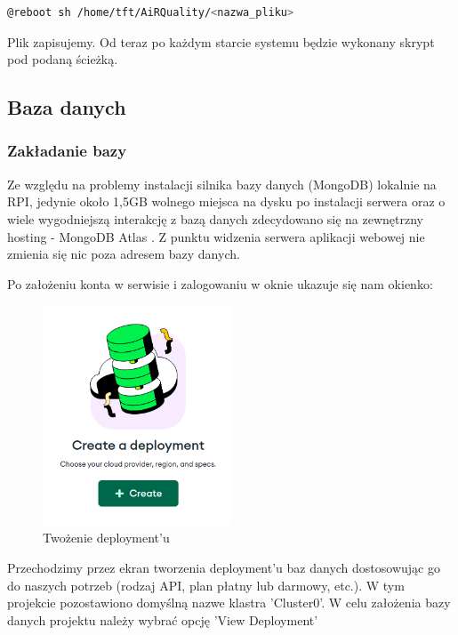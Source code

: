 \begin{lstlisting}[language=bash]
    @reboot sh /home/tft/AiRQuality/<nazwa_pliku>
\end{lstlisting}

Plik zapisujemy. Od teraz po każdym starcie systemu będzie wykonany skrypt pod podaną ścieżką.

\subsection{Baza danych} 

\subsubsection{Zakładanie bazy}

Ze względu na problemy instalacji silnika bazy danych (MongoDB) lokalnie na RPI, jedynie około 1,5GB wolnego miejsca na dysku po instalacji 
serwera oraz o wiele wygodniejszą interakcję z bazą danych zdecydowano się na zewnętrzny hosting - MongoDB Atlas \cite{atlas}. Z punktu 
widzenia serwera aplikacji webowej nie zmienia się nic poza adresem bazy danych.

Po założeniu konta w serwisie i zalogowaniu w oknie ukazuje się nam okienko:

\begin{figure}[H]
    \centering
    \includegraphics[width=0.5\textwidth]{zdj/atlas_1.png}
    \caption{Twożenie deployment'u}
\end{figure}

Przechodzimy przez ekran tworzenia deployment'u baz danych dostosowując go do naszych potrzeb (rodzaj API, plan płatny lub darmowy, etc.). W 
tym projekcie pozostawiono domyślną nazwe klastra 'Cluster0'. W celu założenia bazy danych projektu należy wybrać opcję 'View Deployment'

